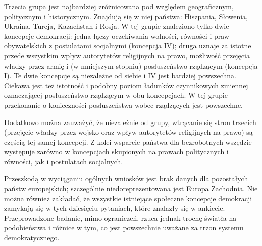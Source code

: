 \documentclass[12pt]{article}
\begin{document}
Trzecia grupa jest najbardziej zróżnicowana pod względem geograficznym, politycznym i historycznym. Znajdują się w niej państwa: Hiszpania, Słowenia, Ukraina, Turcja, Kazachstan i Rosja. W tej grupie znaleziono tylko dwie koncepcje demokracji: jedna łączy oczekiwania wolności, równości i praw obywatelskich z postulatami socjalnymi (koncepcja IV); druga uznaje za istotne przede wszystkim wpływ autorytetów religijnych na prawo, możliwość przejęcia władzy przez armię i (w mniejszym stopniu) posłuszeństwo rządzącym (koncepcja I). Te dwie koncepcje są niezależne od siebie i IV jest bardziej powszechna. Ciekawa jest też istotność i podobny poziom ładunków czynnikowych zmiennej oznaczającej posłuszeństwo rządzącym w obu koncepcjach. W tej grupie przekonanie o konieczności posłuszeństwa wobec rządzących jest powszechne.

Dodatkowo można zauważyć, że niezależnie od grupy, wtrącanie się stron trzecich (przejęcie władzy przez wojsko oraz wpływ autorytetów religijnych na prawo) są częścią tej samej koncepcji. Z kolei wsparcie państwa dla bezrobotnych wszędzie występuje zarówno w koncepcjach skupionych na prawach politycznych i równości, jak i postulatach socjalnych.

Przeszkodą w wyciąganiu ogólnych wniosków jest brak danych dla pozostałych państw europejskich; szczególnie niedoreprezentowana jest Europa Zachodnia. Nie można również zakładać, że wszystkie istniejące społeczne koncepcje demokracji zamykają się w tych dziesięciu pytaniach, które znalazły się w ankiecie. Przeprowadzone badanie, mimo ograniczeń, rzuca jednak trochę światła na podobieństwa i różnice w tym, co jest powszechnie uważane za trzon systemu demokratycznego.

\newpage



\end{document}
